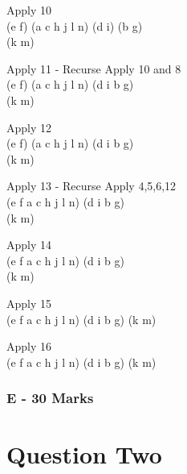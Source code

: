\documentclass[paper=a4, fontsize=11pt]{scrartcl}
\numberwithin{equation}{section}		%
\numberwithin{figure}{section}			%
\numberwithin{table}{section}				%
\begin{document}
\begin{center}
Apply 10 \\
(e f) (a c h j l n) (d i) (b g) \\ (k m)\\
\vspace{4mm}

Apply 11 - Recurse Apply 10 and 8\\
(e f) (a c h j l n) (d i b g) \\ (k m)\\
\vspace{4mm}

Apply 12 \\
(e f) (a c h j l n) (d i b g) \\ (k m)\\
\vspace{4mm}

Apply 13 - Recurse Apply 4,5,6,12\\
(e f a c h j l n) (d i b g) \\ (k m)\\
\vspace{4mm}

Apply 14 \\
(e f a c h j l n) (d i b g) \\ (k m)\\
\vspace{4mm}

Apply 15 \\
(e f a c h j l n) (d i b g) (k m)\\
\vspace{4mm}

Apply 16 \\
(e f a c h j l n) (d i b g) (k m)\\
\end{center}

\subsubsection*{E - 30 Marks}

\iffalse
Reverse the Build algorithm, i,e. design an algorithm that takes a tree with labelled leaves
as an input, and produces a set of constraints of the form (i, j) < (k, l), such that when
Build runs on that set, the result is (an isomorphic copy of) the input tree. Prove the
correctness of your algorithm. Also, a smaller output (number of constraints) would give
you a better mark. 
\fi


\section*{Question Two}
\end{document}

